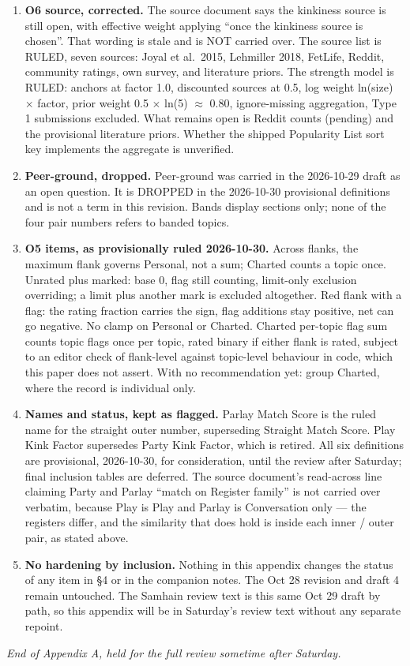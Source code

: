\begin{enumerate}
\def\labelenumi{\arabic{enumi}.}
\tightlist
\item
  \textbf{O6 source, corrected.} The source document says the kinkiness
  source is still open, with effective weight applying ``once the
  kinkiness source is chosen''. That wording is stale and is NOT carried
  over. The source list is RULED, seven sources: Joyal et al.~2015,
  Lehmiller 2018, FetLife, Reddit, community ratings, own survey, and
  literature priors. The strength model is RULED: anchors at factor 1.0,
  discounted sources at 0.5, log weight ln(size) $\times$ factor, prior weight
  0.5 $\times$ ln(5) $\approx$ 0.80, ignore-missing aggregation, Type 1 submissions
  excluded. What remains open is Reddit counts (pending) and the
  provisional literature priors. Whether the shipped Popularity List
  sort key implements the aggregate is unverified.
\item
  \textbf{Peer-ground, dropped.} Peer-ground was carried in the
  2026-10-29 draft as an open question. It is DROPPED in the 2026-10-30
  provisional definitions and is not a term in this revision. Bands
  display sections only; none of the four pair numbers refers to banded
  topics.
\item
  \textbf{O5 items, as provisionally ruled 2026-10-30.} Across flanks,
  the maximum flank governs Personal, not a sum; Charted counts a topic
  once. Unrated plus marked: base 0, flag still counting, limit-only
  exclusion overriding; a limit plus another mark is excluded
  altogether. Red flank with a flag: the rating fraction carries the
  sign, flag additions stay positive, net can go negative. No clamp on
  Personal or Charted. Charted per-topic flag sum counts topic flags
  once per topic, rated binary if either flank is rated, subject to an
  editor check of flank-level against topic-level behaviour in code,
  which this paper does not assert. With no recommendation yet: group
  Charted, where the record is individual only.
\item
  \textbf{Names and status, kept as flagged.} Parlay Match Score is the
  ruled name for the straight outer number, superseding Straight Match
  Score. Play Kink Factor supersedes Party Kink Factor, which is
  retired. All six definitions are provisional, 2026-10-30, for
  consideration, until the review after Saturday; final inclusion tables
  are deferred. The source document's read-across line claiming Party
  and Parlay ``match on Register family'' is not carried over verbatim,
  because Play is Play and Parlay is Conversation only --- the registers
  differ, and the similarity that does hold is inside each inner / outer
  pair, as stated above.
\item
  \textbf{No hardening by inclusion.} Nothing in this appendix changes
  the status of any item in \S 4 or in the companion notes. The Oct 28
  revision and draft 4 remain untouched. The Samhain review text is this
  same Oct 29 draft by path, so this appendix will be in Saturday's
  review text without any separate repoint.
\end{enumerate}

\emph{End of Appendix A, held for the full review sometime after
Saturday.}
